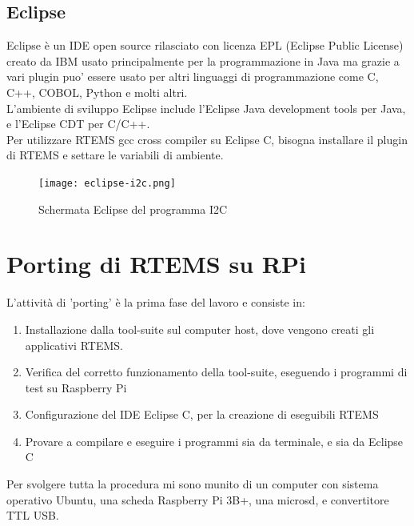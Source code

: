 \documentclass[12pt, a4paper, titlepage, oneside]{book}
\begin{document}
\begin{flushleft}
\section{Eclipse}
Eclipse è un IDE open source rilasciato con licenza EPL (Eclipse Public License) creato da IBM usato principalmente per la programmazione in Java ma grazie a vari plugin puo' essere usato per altri linguaggi di programmazione come C, C++, COBOL, Python e molti altri. \\
L'ambiente di sviluppo Eclipse include l'Eclipse Java development tools per Java, e l'Eclipse CDT per C/C++. \\
Per utilizzare RTEMS gcc cross compiler su Eclipse C, bisogna installare il plugin di RTEMS e settare le variabili di ambiente.
\begin{figure} [h]
    \centering
    \texttt{[image: eclipse-i2c.png]}
    \caption{Schermata Eclipse del programma I2C }
    \label{fig:eclips-i2c}
\end{figure}
\chapter{Porting di RTEMS su RPi}

L'attività di 'porting' è la prima fase del lavoro e consiste in:
\begin{enumerate}
    \item Installazione dalla tool-suite sul computer host, dove vengono creati gli applicativi RTEMS.
    \item Verifica del corretto funzionamento della tool-suite, eseguendo i programmi di test su Raspberry Pi
    \item Configurazione del IDE Eclipse C, per la creazione di eseguibili RTEMS
    \item Provare a compilare e eseguire i programmi sia da terminale, e sia da Eclipse C
\end{enumerate}
Per svolgere tutta la procedura mi sono munito di un computer con sistema operativo Ubuntu, una scheda Raspberry Pi 3B+, una microsd, e convertitore TTL USB.\\


\end{flushleft}
\end{document}
